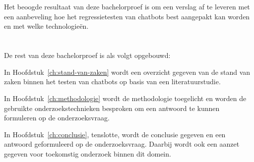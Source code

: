 \section{}
\label{sec:onderzoeksdoelstelling}


Het beoogde resultaat van deze bachelorproef is om een verslag af te leveren met een aanbeveling hoe het regressietesten van chatbots best aangepakt kan worden en met welke technologieën. 

\section{}
\label{sec:opzet-bachelorproef}


De rest van deze bachelorproef is als volgt opgebouwd:

In Hoofdstuk~\ref{ch:stand-van-zaken} wordt een overzicht gegeven van de stand van zaken binnen het testen van chatbots op basis van een literatuurstudie.

In Hoofdstuk~\ref{ch:methodologie} wordt de methodologie toegelicht en worden de gebruikte onderzoekstechnieken besproken om een antwoord te kunnen formuleren op de onderzoeksvraag.


In Hoofdstuk~\ref{ch:conclusie}, tenslotte, wordt de conclusie gegeven en een antwoord geformuleerd op de onderzoeksvraag. Daarbij wordt ook een aanzet gegeven voor toekomstig onderzoek binnen dit domein.


